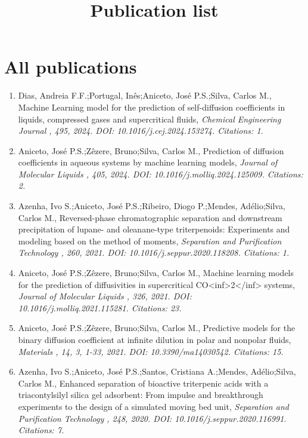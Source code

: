 \documentclass{article}
\begin{document}
\title{Publication list}
\date{}
\maketitle

\section*{All publications}

\begin{enumerate}
    
        \item Dias, Andreia F.F.;Portugal, Inês;Aniceto, José P.S.;Silva, Carlos M., Machine Learning model for the prediction of self-diffusion coefficients in liquids, compressed gases and supercritical fluids, \it{ Chemical Engineering Journal }, 495, 2024. DOI: 10.1016/j.cej.2024.153274. Citations: 1. 
    
        \item Aniceto, José P.S.;Zêzere, Bruno;Silva, Carlos M., Prediction of diffusion coefficients in aqueous systems by machine learning models, \it{ Journal of Molecular Liquids }, 405, 2024. DOI: 10.1016/j.molliq.2024.125009. Citations: 2. 
    
        \item Azenha, Ivo S.;Aniceto, José P.S.;Ribeiro, Diogo P.;Mendes, Adélio;Silva, Carlos M., Reversed-phase chromatographic separation and downstream precipitation of lupane- and oleanane-type triterpenoids: Experiments and modeling based on the method of moments, \it{ Separation and Purification Technology }, 260, 2021. DOI: 10.1016/j.seppur.2020.118208. Citations: 1. 
    
        \item Aniceto, José P.S.;Zêzere, Bruno;Silva, Carlos M., Machine learning models for the prediction of diffusivities in supercritical CO<inf>2</inf> systems, \it{ Journal of Molecular Liquids }, 326, 2021. DOI: 10.1016/j.molliq.2021.115281. Citations: 23. 
    
        \item Aniceto, José P.S.;Zêzere, Bruno;Silva, Carlos M., Predictive models for the binary diffusion coefficient at infinite dilution in polar and nonpolar fluids, \it{ Materials }, 14, 3, 1-33, 2021. DOI: 10.3390/ma14030542. Citations: 15. 
    
        \item Azenha, Ivo S.;Aniceto, José P.S.;Santos, Cristiana A.;Mendes, Adélio;Silva, Carlos M., Enhanced separation of bioactive triterpenic acids with a triacontylsilyl silica gel adsorbent: From impulse and breakthrough experiments to the design of a simulated moving bed unit, \it{ Separation and Purification Technology }, 248, 2020. DOI: 10.1016/j.seppur.2020.116991. Citations: 7. 
    

\end{enumerate}
\end{document}
